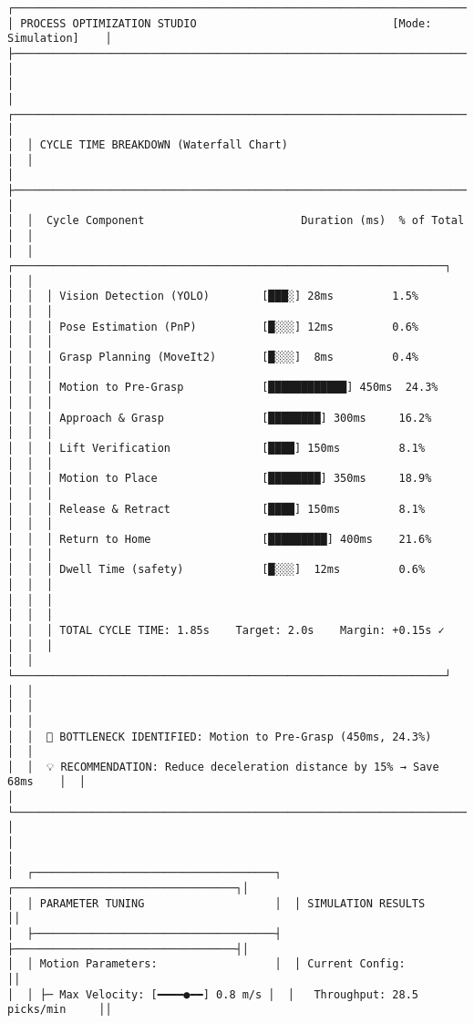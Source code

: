 \documentclass[
]{article}
\begin{document}
\begin{verbatim}
┌────────────────────────────────────────────────────────────────────────────────┐
│ PROCESS OPTIMIZATION STUDIO                              [Mode: Simulation]    │
├────────────────────────────────────────────────────────────────────────────────┤
│                                                                                │
│  ┌─────────────────────────────────────────────────────────────────────────┐  │
│  │ CYCLE TIME BREAKDOWN (Waterfall Chart)                                  │  │
│  ├─────────────────────────────────────────────────────────────────────────┤  │
│  │  Cycle Component                        Duration (ms)  % of Total       │  │
│  │  ┌──────────────────────────────────────────────────────────────────┐  │  │
│  │  │ Vision Detection (YOLO)        [███░] 28ms         1.5%          │  │  │
│  │  │ Pose Estimation (PnP)          [█░░░] 12ms         0.6%          │  │  │
│  │  │ Grasp Planning (MoveIt2)       [█░░░]  8ms         0.4%          │  │  │
│  │  │ Motion to Pre-Grasp            [████████████] 450ms  24.3%       │  │  │
│  │  │ Approach & Grasp               [████████] 300ms     16.2%        │  │  │
│  │  │ Lift Verification              [████] 150ms         8.1%         │  │  │
│  │  │ Motion to Place                [████████] 350ms     18.9%        │  │  │
│  │  │ Release & Retract              [████] 150ms         8.1%         │  │  │
│  │  │ Return to Home                 [█████████] 400ms    21.6%        │  │  │
│  │  │ Dwell Time (safety)            [█░░░]  12ms         0.6%         │  │  │
│  │  │                                                                  │  │  │
│  │  │ TOTAL CYCLE TIME: 1.85s    Target: 2.0s    Margin: +0.15s ✓    │  │  │
│  │  └──────────────────────────────────────────────────────────────────┘  │  │
│  │                                                                         │  │
│  │  🎯 BOTTLENECK IDENTIFIED: Motion to Pre-Grasp (450ms, 24.3%)          │  │
│  │  💡 RECOMMENDATION: Reduce deceleration distance by 15% → Save 68ms    │  │
│  └─────────────────────────────────────────────────────────────────────────┘  │
│                                                                                │
│  ┌─────────────────────────────────────┐  ┌──────────────────────────────────┐│
│  │ PARAMETER TUNING                    │  │ SIMULATION RESULTS               ││
│  ├─────────────────────────────────────┤  ├──────────────────────────────────┤│
│  │ Motion Parameters:                  │  │ Current Config:                  ││
│  │ ├─ Max Velocity: [━━━━●━━] 0.8 m/s │  │   Throughput: 28.5 picks/min     ││

\end{verbatim}
\end{document}
